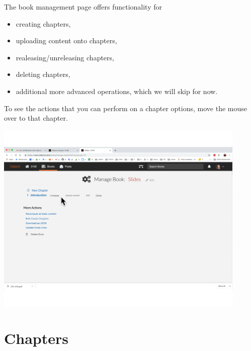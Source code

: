 \begin{gram}
The book management page offers functionality for
\begin{itemize}
\item creating chapters,
\item uploading content onto chapters,
\item realeasing/unreleasing chapters,
\item deleting chapters,
\item additional more advanced operations, which we will skip for now.
\end{itemize}

To see the actions that you can perform on a chapter options, move the mouse over to that chapter. 

\includegraphics[width=0.9\textwidth]{author/media/book-management.pdf}
\end{gram}

\section{Chapters}
\label{guide:chapter}

